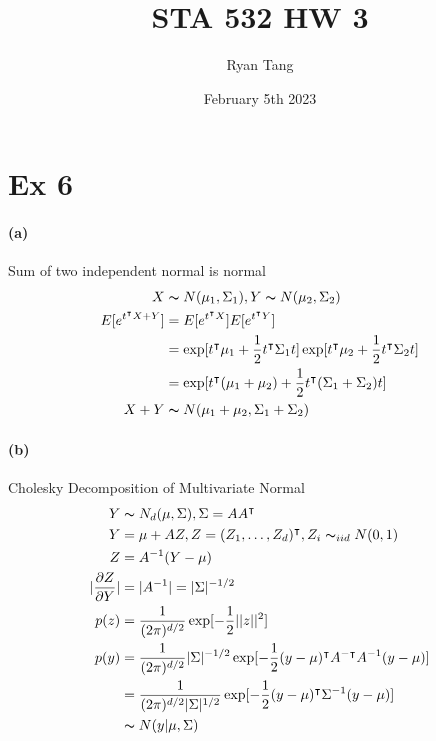 \documentclass[11pt, letterpaper]{article}
\author{Ryan Tang}
\title{STA 532 HW 3}
\date{February 5th 2023}
\begin{document}
\maketitle

\section{Ex 6}
\paragraph{(a)} Sum of two independent normal is normal
\begin{align*}
    X &\thicksim N(\mu_1, \Sigma_1), Y\thicksim N(\mu_2, \Sigma_2) \\
    E[e^{t^{\intercal}{X+Y}}] &= E[e^{t^{\intercal}X}]E[e^{t^{\intercal}Y}] \\
        &= \exp[t^{\intercal}\mu_1 + \frac{1}{2}t^{\intercal}\Sigma_1 t] \exp[t^{\intercal}\mu_2 + \frac{1}{2}t^{\intercal}\Sigma_2 t] \\
        &= \exp[t^{\intercal}(\mu_1+\mu_2) + \frac{1}{2}t^{\intercal}(\Sigma_1+\Sigma_2) t] \\
    X+Y &\thicksim N(\mu_1+\mu_2, \Sigma_1+\Sigma_2)
\end{align*}
\paragraph{(b)} Cholesky Decomposition of Multivariate Normal
\begin{align*}
    Y &\thicksim N_d(\mu, \Sigma), \Sigma = AA^{\intercal} \\
    Y &= \mu + AZ, Z = (Z_1, \dots, Z_d)^{\intercal}, Z_i \thicksim_{iid} N(0, 1) \\
    Z &= A^{-1} (Y - \mu) \\
    |\frac{\partial Z}{\partial Y}| &= |A^{-1}| = |\Sigma|^{-1/2} \\
    p(z) &= \frac{1}{(2\pi)^{d/2}}\exp[-\frac{1}{2}||z||^2] \\
    p(y) &= \frac{1}{(2\pi)^{d/2}} |\Sigma|^{-1/2} \exp[-\frac{1}{2}(y-\mu)^{\intercal}A^{-\intercal}A^{-1}(y-\mu)] \\
        &= \frac{1}{(2\pi)^{d/2} |\Sigma|^{1/2}} \exp[-\frac{1}{2}(y-\mu)^{\intercal}\Sigma^{-1}(y-\mu)] \\
        &\thicksim N(y|\mu, \Sigma)
\end{align*}
\end{document}
